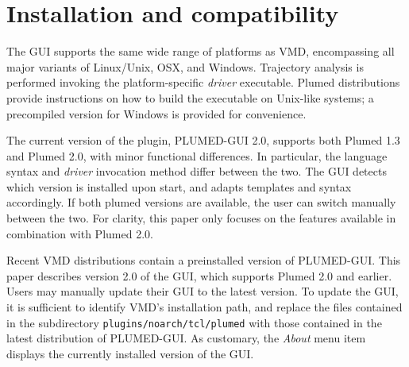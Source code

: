 \documentclass[preprint,12pt]{elsarticle}
\begin{document}
\section{Installation and compatibility}

The GUI supports the same wide range of platforms as VMD, encompassing
all major variants of Linux/Unix, OSX, and Windows.  Trajectory
analysis is performed invoking the platform-specific \emph{driver}
executable. Plumed distributions provide instructions on how to build
the executable on Unix-like systems; a precompiled version for Windows
is provided for convenience.

The current version of the plugin, PLUMED-GUI 2.0, supports both
Plumed 1.3 and Plumed 2.0, with minor functional differences.  In
particular, the language syntax and \emph{driver} invocation method
differ between the two.  The GUI detects which version is installed
upon start, and adapts templates and syntax accordingly.  If both
plumed versions are available, the user can switch manually between
the two. For clarity, this paper only focuses on the features
available in combination with Plumed 2.0.

Recent VMD distributions contain a preinstalled version of PLUMED-GUI.
This paper describes version 2.0 of the GUI, which supports Plumed 2.0
and earlier.  Users may manually update their GUI to the latest
version.  To update the GUI, it is sufficient to identify VMD's
installation path, and replace the files contained in the subdirectory
\texttt{plugins/noarch/tcl/plumed} with those contained in the latest
distribution of PLUMED-GUI.  As customary, the \emph{About} menu item
displays the currently installed version of the GUI.









\end{document}

